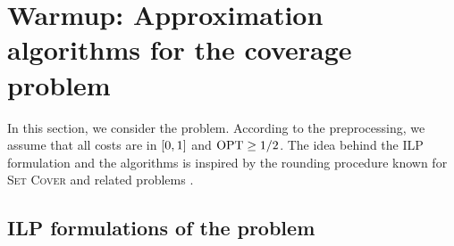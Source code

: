 \section{Warmup: Approximation algorithms for the coverage problem} \label{sec:coverage}

In this section, we consider the \coverage problem. According to the preprocessing, we assume that all costs are in $\mathopen{}\left[ 0,1 \right]$ and $\textnormal{OPT} \geq 1/2$. 
The idea behind the ILP formulation and the algorithms is inspired by the rounding procedure known for \textsc{Set Cover} \cite{vazirani2001approximation} and related problems \cite{Angelidakis2018ShortestPQ}.


\subsection{ILP formulations of the \coverage problem}

